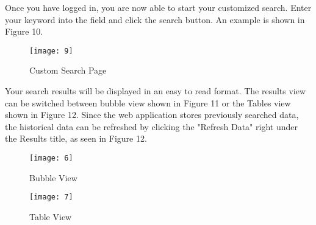 \documentclass[12pt, titlepage]{article}
\begin{document}
Once you have logged in, you are now able to start your customized search. Enter your keyword into the field and click the search button. An example is shown in Figure 10.

\begin{figure}[H]
\centering
\texttt{[image: 9]}
\caption{Custom Search Page}
\label{fig:Menu}
\end{figure}


Your search results will be displayed in an easy to read format. The results view can be switched between bubble view shown in Figure 11 or the Tables view shown in Figure 12.  Since the web application stores previously searched data, the historical data can be refreshed by clicking the "Refresh Data" right under the Results title, as seen in Figure 12. 

\begin{figure}[H]
\centering
\texttt{[image: 6]}
\caption{Bubble View}
\label{fig:Bubble View}
\end{figure}

\begin{figure}[H]
\centering
\texttt{[image: 7]}
\caption{Table View}
\label{fig:Menu}
\end{figure}
\end{document}
